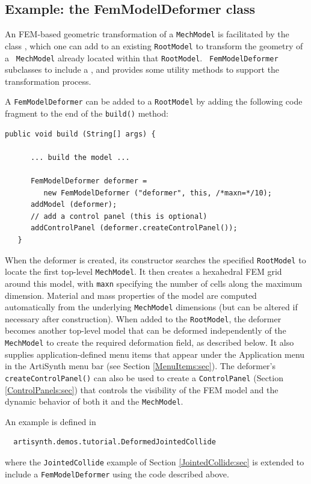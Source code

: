 \subsection{Example: the FemModelDeformer class}
\label{FemModelDeformer:sec}

An FEM-based geometric transformation of a {\tt MechModel} is
facilitated by the class
, which one can
add to an existing {\tt RootModel} to transform the geometry of a {\tt
MechModel} already located within that {\tt RootModel}.  {\tt
FemModelDeformer} subclasses
 to include a
, and
provides some utility methods to support the transformation process.

A {\tt FemModelDeformer} can be added to a {\tt RootModel} by adding
the following code fragment to the end of the {\tt build()} method:
%
\begin{lstlisting}[]
   public void build (String[] args) {

      ... build the model ...

      FemModelDeformer deformer =
         new FemModelDeformer ("deformer", this, /*maxn=*/10);
      addModel (deformer);
      // add a control panel (this is optional)
      addControlPanel (deformer.createControlPanel());  
   }
\end{lstlisting}
%
When the deformer is created, its constructor searches the specified
{\tt RootModel} to locate the first top-level {\tt MechModel}. It then
creates a hexahedral FEM grid around this model, with {\tt maxn} specifying
the number of cells along the maximum dimension. Material and
mass properties of the model are computed automatically from the
underlying {\tt MechModel} dimensions (but can be altered if necessary after
construction). When added to the {\tt RootModel},
the deformer becomes another top-level model that can be deformed
independently of the {\tt MechModel} to create the required
deformation field, as described below. It also supplies application-defined
menu items that appear under the {\sf Application} menu in the ArtiSynth
menu bar (see Section \ref{MenuItems:sec}). 
The deformer's {\tt createControlPanel()} can also be used
to create a {\tt ControlPanel} (Section \ref{ControlPanels:sec}) that
controls the visibility of the FEM model and the dynamic behavior of
both it and the {\tt MechModel}.

An example is defined in 
%
\begin{verbatim}
  artisynth.demos.tutorial.DeformedJointedCollide
\end{verbatim}
%
where the {\tt JointedCollide} example of Section
\ref{JointedCollide:sec} is extended to include a 
{\tt FemModelDeformer} using the code described above.

